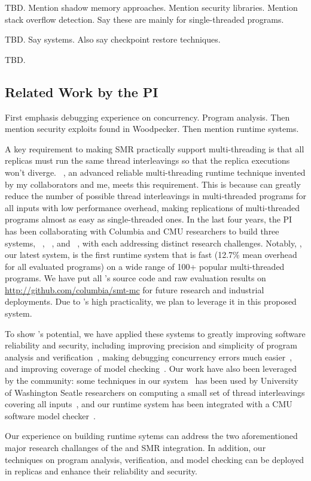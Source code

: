  TBD.
Mention shadow memory approaches.
Mention security libraries.
Mention stack overflow detection.
Say these are mainly for single-threaded programs.

 TBD.
Say systems.
Also say checkpoint restore techniques.

 TBD.



\subsection{Related Work by the PI} \label{sec:my-work}

First emphasis debugging experience on concurrency. Program analysis.
Then mention security exploits found in Woodpecker.
Then mention runtime systems.

A key requirement to making SMR practically support multi-threading is that all 
replicas must run the same thread interleavings so that the replica executions 
won't diverge. \smt~\cite{smt:cacm}, an advanced reliable multi-threading 
runtime technique invented by my collaborators and me, meets this requirement. 
This is because \smt can greatly reduce the number of possible thread 
interleavings in multi-threaded programs for all inputs with low performance 
overhead, making replications of multi-threaded programs almost as easy as 
single-threaded ones. In the last four years, the PI has been collaborating 
with Columbia and CMU researchers to build three \smt systems, 
\tern~\cite{cui:tern:osdi10}, \peregrine~\cite{peregrine:sosp11}, and 
\parrot~\cite{parrot:sosp13}, with each addressing distinct research 
challenges. Notably, \parrot, our latest system, is the first \smt runtime 
system that is fast (12.7\% mean overhead for all evaluated programs) on a wide 
range of 100+ popular multi-threaded programs. We have 
put all \parrot's source code and raw evaluation results on 
\url{http://github.com/columbia/smt-mc} for future research and industrial 
deployments. Due to \parrot's high practicality, we plan to leverage it in this 
proposed \msmr system.

To show \smt's potential, we have applied these systems to greatly improving 
software reliability and security, including improving precision and simplicity 
of program analysis and verification~\cite{wu:pldi12}, making debugging 
concurrency errors much easier~\cite{cui:tern:osdi10}, and improving coverage 
of model checking~\cite{parrot:sosp13}. Our work have also been leveraged by 
the community: some techniques in our \tern system~\cite{cui:tern:osdi10} has 
been used by University of Washington Seatle researchers on computing a small 
set of thread interleavings covering all inputs~\cite{ics:oopsla13}, and our 
\parrot runtime system has been integrated with a CMU software model 
checker~\cite{dbug:spin11}.

Our experience on building \smt runtime sytems can address the two 
aforementioned major research challanges of the \smt and SMR integration. In 
addition, our techniques on program analysis, verification, and model checking 
can be deployed in \msmr replicas and enhance their reliability and security.


